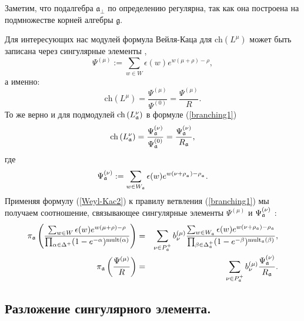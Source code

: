 Заметим, что подалгебра  $\mathfrak{a}_{\bot}$ по определению регулярна, так как она построена на подмножестве корней алгебры $\mathfrak{g}$.

Для интересующих нас модулей формула Вейля-Каца для  $\mathrm{ch}\left( L^{\mu }\right) $ может быть записана через сингулярные элементы \cite{humphreys1997introduction},
\begin{equation*}
\Psi ^{\left( \mu \right) }:=\sum\limits_{w\in W}\epsilon (w)e^{w(\mu +\rho
)-\rho },
\end{equation*}
а именно:
\begin{equation}
\mathrm{ch}\left( L^{\mu }\right) =\frac{\Psi ^{\left( \mu \right) }}{\Psi
^{\left( 0\right) }}=\frac{\Psi ^{\left( \mu \right) }}{R}.
\label{Weyl-Kac2}
\end{equation}
То же верно и для подмодулей $\mathrm{ch}\left( L_{\frak{a}}^{\nu
}\right) $ в формуле (\ref{branching1})
\begin{equation*}
\mathrm{ch}\left( L_{\frak{a}}^{\nu }\right) =\frac{\Psi _{\frak{a}}^{\left(
\nu \right) }}{\Psi _{\frak{a}}^{\left( 0\right) }}=\frac{\Psi _{\frak{a}%
}^{\left( \nu \right) }}{R_{\frak{a}}},
\end{equation*}
где
\begin{equation*}
\Psi _{\frak{a}}^{\left( \nu \right) }:=\sum\limits_{w\in W_{\frak{a}%
}}\epsilon (w)e^{w(\nu +\rho _{_{\frak{a}}})-\rho _{_{\frak{a}}}}.
\end{equation*}
Применяя формулу  (\ref{Weyl-Kac2}) к правилу ветвления  (\ref{branching1}) мы получаем соотношение, связывающее сингулярные элементы $\Psi ^{\left( \mu
\right) }$ и $\Psi _{\frak{a}}^{\left( \nu \right) }$ :
\begin{eqnarray}
\pi _{\frak{a}}\left( \frac{\sum_{w \in W}\epsilon (w )e^{w (\mu +\rho
)-\rho }}{\prod_{\alpha \in \Delta ^{+}}(1-e^{-\alpha })^{\mathrm{mult}%
(\alpha )}}\right) &=&\sum_{\nu \in P_{\frak{a}}^{+}}b_{\nu }^{(\mu )}\frac{%
\sum_{w \in W_{\frak{a}}}\epsilon (w )e^{w (\nu +\rho _{\frak{a}})-\rho _{%
\frak{a}}}}{\prod_{\beta \in \Delta _{\frak{a}}^{+}}(1-e^{-\beta })^{\mathrm{%
mult}_{\frak{a}}(\beta )}},  \notag  \label{eq:4} \\
\pi _{\frak{a}}\left( \frac{\Psi ^{\left( \mu \right) }}{R}\right)
&=&\sum_{\nu \in P_{\frak{a}}^{+}}b_{\nu }^{(\mu )}\frac{\Psi _{\frak{a}%
}^{\left( \nu \right) }}{R_{\frak{a}}}.
\end{eqnarray}

\subsection{Разложение сингулярного элемента.}

